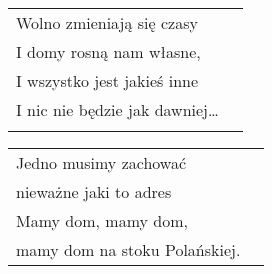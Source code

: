 \documentclass[a5paper]{article}
\begin{document}
\noindent
\begin{tabular}{@{}p{6.10cm}p{3cm}@{}}
Wolno zmieniają się czasy \\
I domy rosną nam własne, \\
I wszystko jest jakieś inne \\
I nic nie będzie jak dawniej… \\ \\
\end{tabular}

\noindent
\begin{tabular}{@{}p{6.60cm}p{3cm}@{}}
Jedno musimy zachować \\
nieważne jaki to adres \\
Mamy dom, mamy dom, \\
mamy dom na stoku Polańskiej.
\end{tabular}
\end{document}
